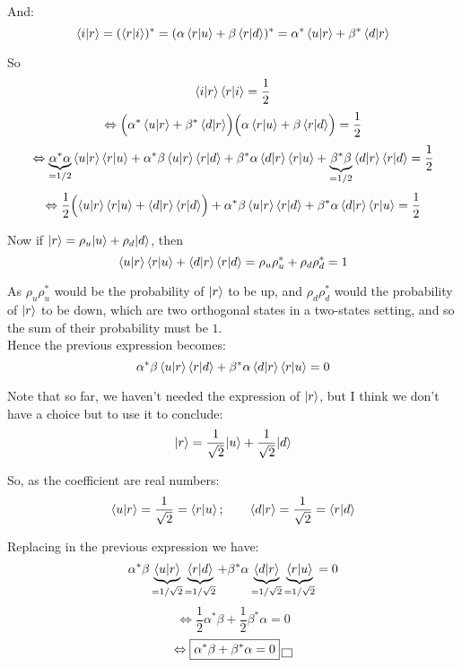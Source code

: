 \documentclass[solutions.tex]{subfiles}
\begin{document}
And:
\[
	\braket{i}{r} = (\braket{r}{i})^* =
		(\alpha\braket{r}{u} + \beta\braket{r}{d})^*
		= \alpha^*\braket{u}{r} + \beta^*\braket{d}{r}
\]

So
\[ \braket{i}{r}\braket{r}{i} = \frac1{2} \]
\[
	\Leftrightarrow
		\Bigl(\alpha^*\braket{u}{r} + \beta^*\braket{d}{r}\Bigr)
		\Bigl(\alpha\braket{r}{u} + \beta\braket{r}{d}\Bigr) = \frac12
\]
\[
	\Leftrightarrow
	\underbrace{\alpha^*\alpha}_{=1/2}\braket{u}{r}\braket{r}{u}
	+\alpha^*\beta\braket{u}{r}\braket{r}{d}
	+\beta^*\alpha\braket{d}{r}\braket{r}{u}
	+\underbrace{\beta^*\beta}_{=1/2}\braket{d}{r}\braket{r}{d} = \frac12
\]
\[
	\Leftrightarrow
	\frac12\Bigl(
		\braket{u}{r}\braket{r}{u}
		+\braket{d}{r}\braket{r}{d}
	\Bigr)+\alpha^*\beta\braket{u}{r}\braket{r}{d}
	+\beta^*\alpha\braket{d}{r}\braket{r}{u} = \frac12
\]

Now if $\ket{r} = \rho_u\ket{u} + \rho_d\ket{d}$, then
\[
	\braket{u}{r}\braket{r}{u}+\braket{d}{r}\braket{r}{d}
	= \rho_u\rho_u^* + \rho_d\rho_d^* = 1
\]

As $\rho_u\rho_u^*$ would be the probability of $\ket{r}$ to
be up, and $\rho_d\rho_d^*$ would the probability of $\ket{r}$ to
be down, which are two orthogonal states in a two-states setting,
and so the sum of their probability must be $1$. \\

Hence the previous expression becomes:
\[
	\alpha^*\beta\braket{u}{r}\braket{r}{d}
	+\beta^*\alpha\braket{d}{r}\braket{r}{u} = 0
\]

Note that so far, we haven't needed the expression of $\ket{r}$, but
I think we don't have a choice but to use it to conclude:
\[
	\ket{r} = \frac1{\sqrt2}\ket{u} + \frac1{\sqrt2}\ket{d}
\]

So, as the coefficient are real numbers:
\[
	\braket{u}{r} = \frac1{\sqrt2} = \braket{r}{u};\qquad
	\braket{d}{r} = \frac1{\sqrt2} = \braket{r}{d}
\]

Replacing in the previous expression we have:
\[
	\alpha^*\beta\underbrace{\braket{u}{r}}_{=1/\sqrt2}
	\underbrace{\braket{r}{d}}_{=1/\sqrt2}
	+\beta^*\alpha\underbrace{\braket{d}{r}}_{=1/\sqrt2}
	\underbrace{\braket{r}{u}}_{=1/\sqrt2} = 0
\]
\[
	\Leftrightarrow
	\frac12\alpha^*\beta + \frac12\beta^*\alpha = 0
\]
\[
	\Leftrightarrow
	\boxed{\alpha^*\beta + \beta^*\alpha = 0}\qed
\]
\end{document}
